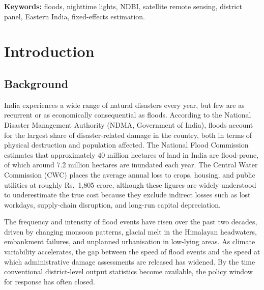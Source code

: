 \documentclass[12pt,a4paper,oneside]{report}
\begin{document}
\vspace{0.2in}
\noindent\textbf{Keywords:} floods, nighttime lights, NDBI, satellite remote sensing, district panel, Eastern India, fixed-effects estimation.

\clearpage
\renewcommand{\contentsname}{Contents}
\tableofcontents

\clearpage
{}
\listoffigures

\clearpage
{}
\listoftables

\clearpage
{}
\setcounter{page}{1}

\chapter{Introduction}

\section{Background}
India experiences a wide range of natural disasters every year, but few are as recurrent or as economically consequential as floods. According to the National Disaster Management Authority (NDMA, Government of India), floods account for the largest share of disaster-related damage in the country, both in terms of physical destruction and population affected. The National Flood Commission estimates that approximately 40 million hectares of land in India are flood-prone, of which around 7.2 million hectares are inundated each year. The Central Water Commission (CWC) places the average annual loss to crops, housing, and public utilities at roughly Rs.~1{,}805 crore, although these figures are widely understood to underestimate the true cost because they exclude indirect losses such as lost workdays, supply-chain disruption, and long-run capital depreciation.

The frequency and intensity of flood events have risen over the past two decades, driven by changing monsoon patterns, glacial melt in the Himalayan headwaters, embankment failures, and unplanned urbanisation in low-lying areas. As climate variability accelerates, the gap between the speed of flood events and the speed at which administrative damage assessments are released has widened. By the time conventional district-level output statistics become available, the policy window for response has often closed.
\end{document}
